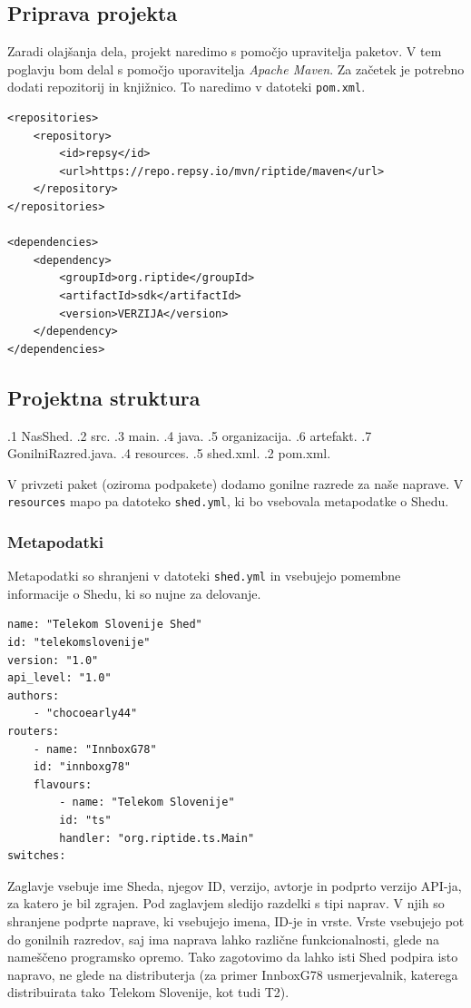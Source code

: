 \documentclass[12pt]{article}
\begin{document}
\subsection{Priprava projekta}
Zaradi olajšanja dela, projekt naredimo s pomočjo upravitelja paketov. V
tem poglavju bom delal s pomočjo uporavitelja \textit{Apache Maven}. Za
začetek je potrebno dodati repozitorij in knjižnico. To naredimo v datoteki
\texttt{pom.xml}.

\begin{lstlisting}[style=XmlStyle]
<repositories>
	<repository>
		<id>repsy</id>
		<url>https://repo.repsy.io/mvn/riptide/maven</url>
	</repository>
</repositories>

<dependencies>
	<dependency>
		<groupId>org.riptide</groupId>
		<artifactId>sdk</artifactId>
		<version>VERZIJA</version>
	</dependency>
</dependencies>
\end{lstlisting}
\newpage

\subsection{Projektna struktura} \label{projektna-struktura}
\begin{dirtree}{%
.1 NasShed.
	.2 src.
		.3 main.
			.4 java.
				.5 organizacija.
					.6 artefakt.
						.7 GonilniRazred.java.
			.4 resources.
				.5 shed.xml.
	.2 pom.xml.
}
\end{dirtree}
\vspace*{12pt}
V privzeti paket (oziroma podpakete) dodamo gonilne razrede za naše naprave.
V \texttt{resources} mapo pa datoteko \texttt{shed.yml}, ki bo vsebovala
metapodatke o Shedu.

\subsubsection{Metapodatki}
Metapodatki so shranjeni v datoteki \texttt{shed.yml} in vsebujejo pomembne
informacije o Shedu, ki so nujne za delovanje.

\begin{lstlisting}[style=XmlStyle]
name: "Telekom Slovenije Shed"
id: "telekomslovenije"
version: "1.0"
api_level: "1.0"
authors:
	- "chocoearly44"
routers:
	- name: "InnboxG78"
	id: "innboxg78"
	flavours:
		- name: "Telekom Slovenije"
		id: "ts"
		handler: "org.riptide.ts.Main"
switches:
\end{lstlisting}
Zaglavje vsebuje ime Sheda, njegov ID, verzijo, avtorje in podprto verzijo
API-ja, za katero je bil zgrajen. Pod zaglavjem sledijo razdelki s tipi
naprav. V njih so shranjene podprte naprave, ki vsebujejo imena, ID-je in
vrste. Vrste vsebujejo pot do gonilnih razredov, saj ima naprava lahko
različne funkcionalnosti, glede na nameščeno programsko opremo. Tako
zagotovimo da lahko isti Shed podpira isto napravo, ne glede na
distributerja (za primer InnboxG78 usmerjevalnik, katerega distribuirata
tako Telekom Slovenije, kot tudi T2).
\end{document}

